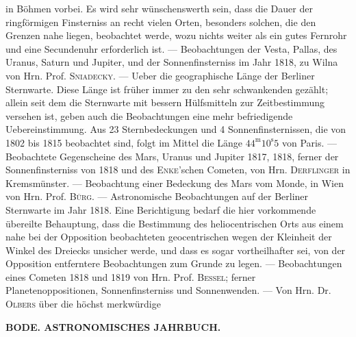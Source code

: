 in Böhmen vorbei. Es wird sehr wünschenswerth sein, dass die Dauer der ringförmigen Finsterniss an recht vielen Orten, besonders solchen, die den Grenzen nahe liegen, beobachtet werde, wozu nichts weiter als ein gutes Fernrohr und eine Secundenuhr erforderlich ist. --- Beobachtungen der Vesta, Pallas, des Uranus, Saturn und Jupiter, und der Sonnenfinsterniss im Jahr 1818, zu Wilna von Hrn. Prof. \textsc{Sniadecky}. --- Ueber die geographische Länge der Berliner Sternwarte. Diese Länge ist früher immer zu den sehr schwankenden gezählt; allein seit dem die Sternwarte mit bessern Hülfsmitteln zur Zeitbestimmung versehen ist, geben auch die Beobachtungen eine mehr befriedigende Uebereinstimmung. Aus 23 Sternbedeckungen und 4 Sonnenfinsternissen, die von 1802 bis 1815 beobachtet sind, folgt im Mittel die Länge $44^{\mathrm{m}}10^{\mathrm{s}}5$ von Paris. --- Beobachtete Gegenscheine des Mars, Uranus und Jupiter 1817, 1818, ferner der Sonnenfinsterniss von 1818 und des \textsc{Enke}'schen Cometen, von Hrn. \textsc{Derflinger} in Kremsmünster. --- Beobachtung einer Bedeckung des Mars vom Monde, in Wien von Hrn. Prof. \textsc{Bürg}. --- Astronomische Beobachtungen auf der Berliner Sternwarte im Jahr 1818. Eine Berichtigung bedarf die hier vorkommende übereilte Behauptung, dass die Bestimmung des heliocentrischen Orts aus einem nahe bei der Opposition beobachteten geocentrischen wegen der Kleinheit der Winkel des Dreiecks unsicher werde, und dass es sogar vortheilhafter sei, von der Opposition entferntere Beobachtungen zum Grunde zu legen. --- Beobachtungen eines Cometen 1818 und 1819 von Hrn. Prof. \textsc{Bessel}; ferner Planetenoppositionen, Sonnenfinsterniss und Sonnenwenden. --- Von Hrn. Dr. \textsc{Olbers} über die höchst merkwürdige\par
\clearpage
{}
\noindent\makebox[10mm][l]{}%
\parbox[b]{\dimexpr\textwidth-20mm\relax}{\centering\small\textbf{BODE. ASTRONOMISCHES JAHRBUCH.}}%
\par\nobreak\medskip
